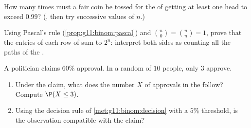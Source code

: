\begin{exercise}[$\star\star$]\label{exo:g11:binom:9}
How many times must a fair coin be tossed for the  of getting
at least one head to exceed $0.99$? (, then try successive
values of $n$.)
\end{exercise}

\begin{exercise}[$\star\star$]\label{exo:g11:binom:10}
Using Pascal's rule (\cref{prop:g11:binom:pascal}) and
$\binom n0 = \binom nn = 1$, prove that the entries of each row of
 sum to $2^n$: interpret both sides as counting all the
paths of the .
\end{exercise}

\begin{exercise}[$\star\star\star$]\label{exo:g11:binom:11}
A politician claims $60\%$ approval. In a random  of $10$ people,
only $3$ approve.
\begin{enumerate}
  \item Under the claim, what  does the number $X$ of
        approvals in the  follow? Compute $\P(X \leq 3)$.
  \item Using the decision rule of \cref{met:g11:binom:decision} with a
        $5\%$ threshold, is the observation compatible with the claim?
\end{enumerate}
\end{exercise}
